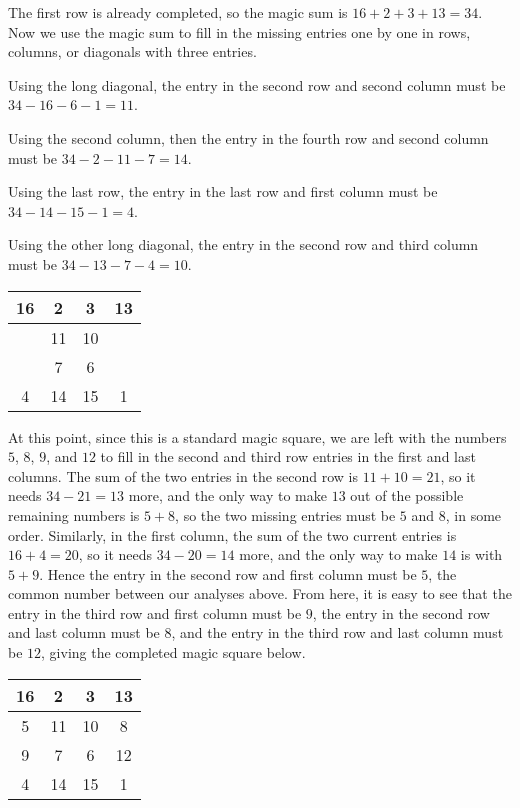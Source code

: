 \documentclass[11pt]{article}
\begin{document}
\begin{solution}
The first row is already completed, so the magic sum is $16 + 2 + 3 + 13 = 34$.
Now we use the magic sum to fill in the missing entries one by one in rows, columns, or diagonals with three entries.

Using the long diagonal, the entry in the second row and second column must be $34-16-6-1=11$.

Using the second column, then the entry in the fourth row and second column must be $34-2-11-7=14$.

Using the last row, the entry in the last row and first column must be $34-14-15-1=4$.

Using the other long diagonal, the entry in the second row and third column must be $34-13-7-4=10$.

\begin{center}
\begin{tabular}{|c|c|c|c|}
\hline
16 & 2 & 3 & 13 \\ \hline
\phantom{5} & 11 & 10 & \phantom{8} \\ \hline
\phantom{9} & 7 & 6 & \phantom{12} \\ \hline
4 & 14 & 15 & 1 \\ \hline
\end{tabular}
\end{center}

At this point, since this is a standard magic square, we are left with the numbers $5$, $8$, $9$, and $12$ 
to fill in the second and third row entries in the first and last columns. The sum of the two entries
in the second row is $11+10 = 21$, so it needs $34-21 = 13$ more, and the only way to make $13$ out of
the possible remaining numbers is $5+8$, so the two missing entries must be $5$ and $8$, in some order.
Similarly, in the first column, the sum of the two current entries is $16+4=20$, so it needs $34-20=14$
more, and the only way to make $14$ is with $5+9$. Hence the entry in the second row and first column
must be $5$, the common number between our analyses above. From here, it is easy to see that the entry in
the third row and first column must be $9$, the entry in the second row and last column must be $8$,
and the entry in the third row and last column must be $12$, giving the completed magic square below.

\begin{center}
\begin{tabular}{|c|c|c|c|}
\hline
16 & 2 & 3 & 13 \\ \hline
5 & 11 & 10 & 8 \\ \hline
9 & 7 & 6 & 12 \\ \hline
4 & 14 & 15 & 1 \\ \hline
\end{tabular}
\end{center}
\end{solution}
\end{document}
